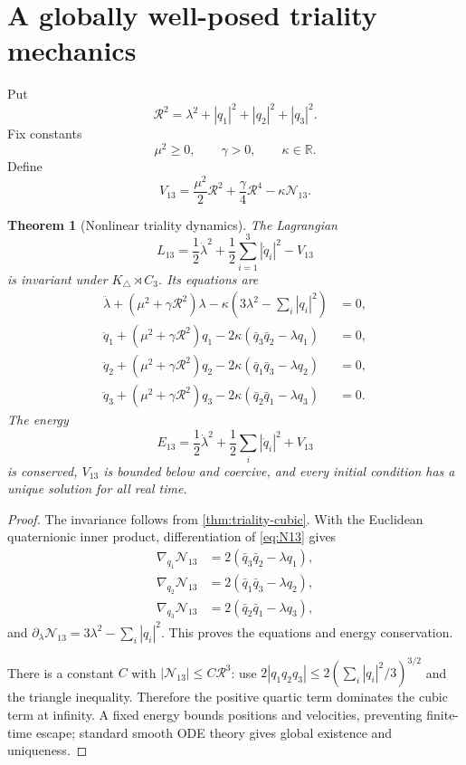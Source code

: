 \documentclass[11pt]{article}
\newtheorem{theorem}{Theorem}[section]
\theoremstyle{definition}
\theoremstyle{remark}
\newcommand{\R}{\mathbb R}
\newcommand{\cN}{\mathcal N}
\begin{document}
\section{A globally well-posed triality mechanics}

Put
\begin{equation}\label{eq:R2}
 \mathscr R^2=\lambda^2+|q_1|^2+|q_2|^2+|q_3|^2.
\end{equation}
Fix constants
\[
 \mu^2\geq0,\qquad \gamma>0,\qquad \kappa\in\R.
\]
Define
\begin{equation}\label{eq:V13}
 V_{13}
 =\frac{\mu^2}{2}\mathscr R^2
 +\frac{\gamma}{4}\mathscr R^4
 -\kappa\cN_{13}.
\end{equation}

\begin{theorem}[Nonlinear triality dynamics]\label{thm:triality-dynamics}
The Lagrangian
\begin{equation}\label{eq:L13-mechanics}
 L_{13}
 =\frac12\dot\lambda^2+\frac12\sum_{i=1}^3|\dot q_i|^2-V_{13}
\end{equation}
is invariant under $K_\triangle\rtimes C_3$.  Its equations are
\begin{align}\label{eq:lambda-eom}
 \ddot\lambda+(\mu^2+\gamma\mathscr R^2)\lambda
 -\kappa\left(3\lambda^2-\sum_i|q_i|^2\right)&=0,\\
 \ddot q_1+(\mu^2+\gamma\mathscr R^2)q_1
 -2\kappa(\bar q_3\bar q_2-\lambda q_1)&=0,\label{eq:q1-eom}\\
 \ddot q_2+(\mu^2+\gamma\mathscr R^2)q_2
 -2\kappa(\bar q_1\bar q_3-\lambda q_2)&=0,\label{eq:q2-eom}\\
 \ddot q_3+(\mu^2+\gamma\mathscr R^2)q_3
 -2\kappa(\bar q_2\bar q_1-\lambda q_3)&=0.\label{eq:q3-eom}
\end{align}
The energy
\begin{equation}\label{eq:E13}
 E_{13}=\frac12\dot\lambda^2+\frac12\sum_i|\dot q_i|^2+V_{13}
\end{equation}
is conserved, $V_{13}$ is bounded below and coercive, and every initial condition has a unique solution for all real time.
\end{theorem}

\begin{proof}
The invariance follows from \cref{thm:triality-cubic}.  With the Euclidean quaternionic inner product, differentiation of \eqref{eq:N13} gives
\begin{align*}
 \nabla_{q_1}\cN_{13}&=2(\bar q_3\bar q_2-\lambda q_1),\\
 \nabla_{q_2}\cN_{13}&=2(\bar q_1\bar q_3-\lambda q_2),\\
 \nabla_{q_3}\cN_{13}&=2(\bar q_2\bar q_1-\lambda q_3),
\end{align*}
and $\partial_\lambda\cN_{13}=3\lambda^2-\sum_i|q_i|^2$.  This proves the equations and energy conservation.

There is a constant $C$ with $|\cN_{13}|\leq C\mathscr R^3$: use
$2|q_1q_2q_3|\leq2(\sum_i|q_i|^2/3)^{3/2}$ and the triangle inequality.  Therefore the positive quartic term dominates the cubic term at infinity.  A fixed energy bounds positions and velocities, preventing finite-time escape; standard smooth ODE theory gives global existence and uniqueness.
\end{proof}
\end{document}
